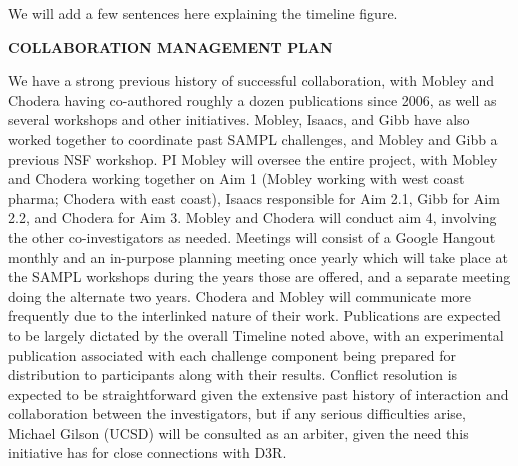 \documentclass[11pt]{article}
\begin{document}
We will add a few sentences here explaining the timeline figure.





{\large \bf COLLABORATION MANAGEMENT PLAN} %

We have a strong previous history of successful collaboration, with Mobley and Chodera having co-authored roughly a dozen publications since 2006, as well as several workshops and other initiatives.
Mobley, Isaacs, and Gibb have also worked together to coordinate past SAMPL challenges, and Mobley and Gibb a previous NSF workshop. 
PI Mobley will oversee the entire project, with Mobley and Chodera working together on Aim 1 (Mobley working with west coast pharma; Chodera with east coast), Isaacs responsible for Aim 2.1, Gibb for Aim 2.2, and Chodera for Aim 3. Mobley and Chodera will conduct aim 4, involving the other co-investigators as needed.
Meetings will consist of a Google Hangout monthly and an in-purpose planning meeting once yearly which will take place at the SAMPL workshops during the years those are offered, and a separate meeting doing the alternate two years.
Chodera and Mobley will communicate more frequently due to the interlinked nature of their work.
Publications are expected to be largely dictated by the overall Timeline noted above, with an experimental publication associated with each challenge component being prepared for distribution to participants along with their results.
Conflict resolution is expected to be straightforward given the extensive past history of interaction and collaboration between the investigators, but if any serious difficulties arise, Michael Gilson (UCSD) will be consulted as an arbiter, given the need this initiative has for close connections with D3R.
\end{document}
